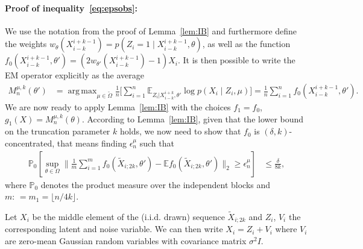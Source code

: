 \documentclass[twoside,11pt]{article}
\newcommand{\numobs}{\ensuremath{n}}
\DeclareMathOperator*{\argmax}{arg\, max}
\def\EE{ \mathbb{E} }
\newcommand{\subsize}{\numobs} %
\newcommand{\subprob}{\delta}
\newcommand{\blocksize}{\ensuremath{m}}
\newcommand{\EEzcondx}[3]{\ensuremath{\EE_{#1|#2,#3}}}
\newcommand{\weightsingle}[2]{w_{#1}(#2)}
\newcommand{\epsilonobs}{\epsilon^\paramobs}
\newcommand{\paramobs}{\mu}
\newcommand{\paramobsone}{\ensuremath{\paramobs}}
\newcommand{\paramjoint}{\theta}
\newcommand{\paramjointtwo}{\paramjoint'}
\newcommand{\paramjointwo}{\paramjointtwo}
\newcommand{\emopsamptruncobs}[1]{\ensuremath{M_{\subsize}^{\paramobs,k}(#1)}}
\newcommand{\mprob}{\ensuremath{\mathbb{P}}}
\newcommand{\defn}{: \, = }
\newcommand{\DomTheta}{\ensuremath{\Omega}}
\newcommand{\kdim}{\ensuremath{k}}
\newcommand{\myparagraph}[1]{\paragraph{#1:}}
\newcommand{\Xtil}{\ensuremath{\widetilde{X}}}
\newcommand{\DomThetaFeas}{\widetilde{\DomTheta}}
\begin{document}



\myparagraph{Proof of inequality~\eqref{eq:epsobs}} We use the
notation from the proof of Lemma~\ref{lem:IB} and furthermore define
the weights $\weightsingle{\paramjoint}{X_{i-k}^{i+k-1}} = p(Z_i =1
\mid X_{i-k}^{i+k-1},\theta)$, as well as the function
\mbox{$f_0(X_{i-k}^{i+k-1}, \paramjoint') = (2
  \weightsingle{\paramjoint'}{X_{i-k}^{i+k-1}} - 1) X_i$.}  It is then
possible to write the EM operator explicitly as the
average
\begin{align*}
\emopsamptruncobs{\paramjoint'} & = \argmax_{\paramobs \in \DomThetaFeas}
\frac{1}{\subsize} \Big[ \sum_{i=1}^{\subsize}
  \EEzcondx{Z_i}{X_{i-\kdim}^{i+\kdim}}{\paramjointwo} \log p(X_i \mid
  Z_i,\paramobsone) \Big] = \frac{1}{\numobs} \sum_{i=1}^{\subsize}
f_0 (X_{i-k}^{i+k-1}, \paramjoint').
\end{align*}
We are now ready to apply Lemma~\ref{lem:IB} with the choices $f_1 =
f_0$, $g_1(X) = \emopsamptruncobs{\paramjoint} $.  According to
Lemma~\ref{lem:IB}, given that the lower bound on the truncation
parameter $k$ holds, we now need to show that $f_0$ is
$(\subprob,\kdim)$-concentrated, that means finding
$\epsilonobs_{\numobs}$ such that
\begin{align*}
\mprob_0\left [ \sup_{\theta \in \DomTheta}\big\| \frac{1}{\blocksize}\sum_{i=1}^\blocksize
  f_0(\Xtil_{i;2k},\paramjoint') - \EE f_0(\Xtil_{i;2k},\paramjoint') \big\|_2 \geq
  \epsilonobs_{\numobs} \right] & \leq \frac{\subprob}{8 \kdim},
\end{align*}
where $\mprob_0$ denotes the product measure over the independent blocks
and $\blocksize \defn \blocksize_1 = \lfloor \subsize/ 4 \kdim \rfloor$.

Let $X_i$ be the middle element of the (i.i.d. drawn) sequence $\Xtil_{i;2k}$ and $Z_i$,
$V_i$ the corresponding latent and noise variable. We can then write
$X_i = Z_i + V_i$ where $V_i$ are zero-mean Gaussian random variables
with covariance matrix $\sigma^2 I$.
\end{document}
